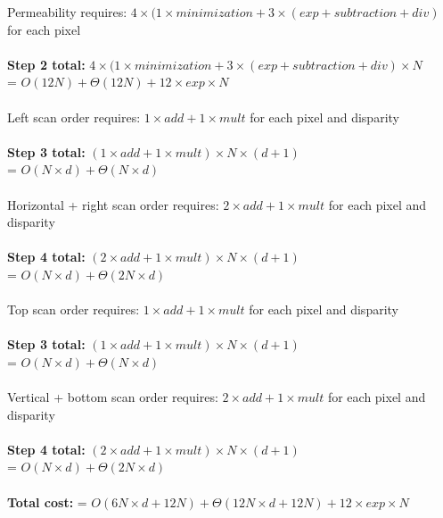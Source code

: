 Permeability requires: $4 \times (1 \times minimization + 3 \times (exp + subtraction + div)$ for each pixel\\~\\
\textbf{Step 2 total:} $4 \times (1 \times minimization + 3 \times (exp + subtraction + div) \times N$\\
= $O(12N)+\Theta(12N) + 12 \times exp \times N$\\~\\

Left scan order requires: $1 \times add + 1 \times mult$ for each pixel and disparity\\~\\
\textbf{Step 3 total:} $(1 \times add + 1 \times mult) \times N \times (d+1)$\\
= $O(N\times d) +\Theta(N\times d)$\\~\\

Horizontal + right scan order requires: $2 \times add + 1 \times mult$ for each pixel and disparity\\~\\
\textbf{Step 4 total:} $(2 \times add + 1 \times mult) \times N \times (d+1)$\\
= $O(N\times d) +\Theta(2N\times d)$\\~\\

Top scan order requires: $1 \times add + 1 \times mult$ for each pixel and disparity\\~\\
\textbf{Step 3 total:} $(1 \times add + 1 \times mult) \times N \times (d+1)$\\
= $O(N\times d) +\Theta(N\times d)$\\~\\

Vertical + bottom scan order requires: $2 \times add + 1 \times mult$ for each pixel and disparity\\~\\
\textbf{Step 4 total:} $(2 \times add + 1 \times mult) \times N \times (d+1)$\\
= $O(N\times d) +\Theta(2N\times d)$\\~\\

\textbf{Total cost:} = $O(6N \times d + 12N) + \Theta(12 N \times d + 12 N) + 12 \times exp \times N$

